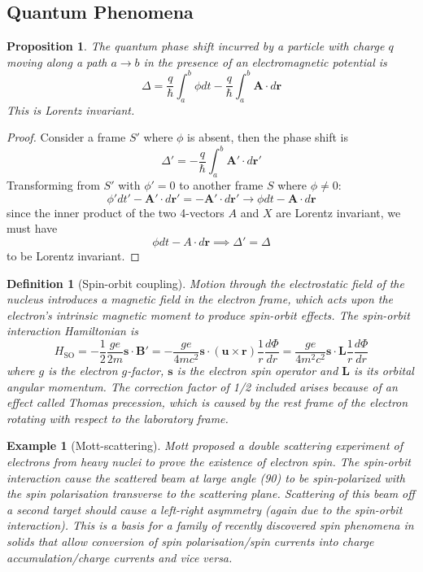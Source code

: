 \documentclass[a4paper]{article}
\newtheorem{eg}{Example}[section]
\theoremstyle{new}
\newtheorem{defi}{Definition}[section]
\newtheorem{prop}{Proposition}[section]
\begin{document}
\subsection{Quantum Phenomena}
\begin{prop}
The quantum phase shift incurred by a particle with charge $q$ moving along a path $a\rightarrow b$ in the presence of an electromagnetic potential is
$$\Delta=\frac{q}{\hbar}\int_a^b\phi dt-\frac{q}{\hbar}\int_a^b\mathbf{A}\cdot d\mathbf{r}$$
This is Lorentz invariant.
\end{prop}
\begin{proof}
Consider a frame $S'$ where $\phi$ is absent, then the phase shift is
$$\Delta'=-\frac{q}{\hbar}\int_a^b\mathbf{A'}\cdot d\mathbf{r'}$$
Transforming from $S'$ with $\phi'=0$ to another frame $S$ where $\phi\neq 0$:
$$\phi'dt'-\mathbf{A'}\cdot d\mathbf{r'}=-\mathbf{A'}\cdot d\mathbf{r'}\rightarrow\phi dt-\mathbf{A}\cdot d\mathbf{r}$$
since the inner product of the two 4-vectors $A$ and $X$ are Lorentz invariant, we must have
$$\phi dt-A\cdot d\mathbf{r}\implies\Delta'=\Delta$$
to be Lorentz invariant.
\end{proof}
\begin{defi}[Spin-orbit coupling]
Motion through the electrostatic field of the nucleus introduces a magnetic field in the electron frame, which acts upon the electron's intrinsic magnetic moment to produce spin-orbit effects. The spin-orbit interaction Hamiltonian is
$$H_{\text{SO}}=-\frac{1}{2}\frac{ge}{2m}\mathbf{s}\cdot\mathbf{B'}=-\frac{ge}{4mc^2}\mathbf{s}\cdot(\mathbf{u}\times\mathbf{r})\frac{1}{r}\frac{d\Phi}{dr}=\frac{ge}{4m^2c^2}\mathbf{s}\cdot\mathbf{L}\frac{1}{r}\frac{d\Phi}{dr}$$
where $g$ is the electron $g$-factor, $\mathbf{s}$ is the electron spin operator and $\mathbf{L}$ is its orbital angular momentum. The correction factor of 1/2 included arises because of an effect called Thomas precession, which is caused by the rest frame of the electron rotating with respect to the laboratory frame.
\end{defi}
\begin{eg}[Mott-scattering]
Mott proposed a double scattering experiment of electrons from heavy nuclei to prove the existence of electron spin. The spin-orbit interaction cause the scattered beam at large angle (90\degree) to be spin-polarized with the spin polarisation transverse to the scattering plane. Scattering of this beam off a second target should cause a left-right asymmetry (again due to the spin-orbit interaction). This is a basis for a family of recently discovered spin phenomena in solids that allow conversion of spin polarisation/spin currents into charge accumulation/charge currents and vice versa.
\end{eg}
\end{document}
